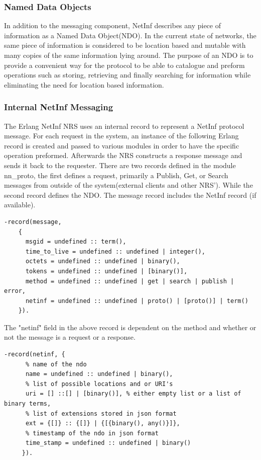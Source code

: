 \subsubsection{Named Data Objects}
In addition to the messaging component, NetInf describes any piece of information as a Named Data Object(NDO). In the current state of networks, the same piece of information is considered to be location based and mutable with many copies of the same information lying around. The purpose of an NDO is to provide a convenient way for the protocol to be able to catalogue and preform operations such as storing, retrieving and finally searching for information while eliminating the need for location based information.

\subsubsection{Internal NetInf Messaging}

The Erlang NetInf NRS uses an internal record to represent a NetInf protocol message. For each request in the system, an instance of the following Erlang record is created and passed to various modules in order to have the specific operation preformed. Afterwards the NRS constructs a response message and sends it back to the requester. There are two records defined in the module nn\_proto, the first defines a request, primarily a Publish, Get, or Search messages from outside of the system(external clients and other NRS'). While the second record defines the NDO. The message record includes the NetInf record (if available). 

\label{NDO-message}
\begin{verbatim}
-record(message, 
	{
	  msgid = undefined :: term(),
	  time_to_live = undefined :: undefined | integer(),
	  octets = undefined :: undefined | binary(),
	  tokens = undefined :: undefined | [binary()],
	  method = undefined :: undefined | get | search | publish | error,
	  netinf = undefined :: undefined | proto() | [proto()] | term()
	}).
\end{verbatim}

The "netinf" field in the above record is dependent on the method and whether or not the message is a request or a response.

\begin{verbatim}
-record(netinf, {
	  % name of the ndo
	  name = undefined :: undefined | binary(),
	  % list of possible locations and or URI's
	  uri = [] ::[] | [binary()], % either empty list or a list of binary terms,
	  % list of extensions stored in json format
	  ext = {[]} :: {[]} | {[{binary(), any()}]}, 
	  % timestamp of the ndo in json format
	  time_stamp = undefined :: undefined | binary() 
	 }).
\end{verbatim}

